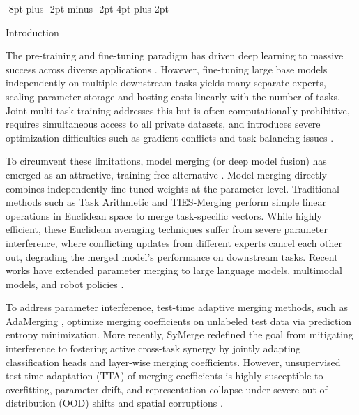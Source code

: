 \documentclass{article}
\makeatletter
\theoremstyle{plain}
\theoremstyle{definition}
\theoremstyle{remark}
\renewcommand{\section}{\@startsection{section}{1}{\z@}%
                       {-8pt plus -2pt minus -2pt}%
                       {4pt plus 2pt}%
                       {\normalfont\large\bfseries\raggedright}}
\makeatother
\begin{document}
\section{Introduction}
\label{sec:intro}

The pre-training and fine-tuning paradigm has driven deep learning to massive success across diverse applications \cite{devlin2018bert,vaswani2017attention,he2016deep,dosovitskiy2020image,aslam2024continual,baysal2025overcoming,tseng2025incremental}. However, fine-tuning large base models independently on multiple downstream tasks yields many separate experts, scaling parameter storage and hosting costs linearly with the number of tasks. Joint multi-task training addresses this but is often computationally prohibitive, requires simultaneous access to all private datasets, and introduces severe optimization difficulties such as gradient conflicts and task-balancing issues \cite{yadav2023ties,mao2025multi-task,wu2025attention-based,cao2024multi-task,huang2025optimization,boiarov2021simultaneous,he2024robust,fan2023maxgnr,choi2023task-aware}.

To circumvent these limitations, model merging (or deep model fusion) has emerged as an attractive, training-free alternative \cite{wortsman2022model,ilharco2022editing,li2023deep,tang2024fusionbench,saadati2024dimat,du2024parameter,liu2025sens-merging,qiu2026parameter,zeng2025robustmerge,zeng2025parameter}. Model merging directly combines independently fine-tuned weights at the parameter level. Traditional methods such as Task Arithmetic \cite{ilharco2022editing} and TIES-Merging \cite{yadav2023ties} perform simple linear operations in Euclidean space to merge task-specific vectors. While highly efficient, these Euclidean averaging techniques suffer from severe parameter interference, where conflicting updates from different experts cancel each other out, degrading the merged model's performance on downstream tasks. Recent works have extended parameter merging to large language models, multimodal models, and robot policies \cite{jang2023personalized,yadav2025robust,li2025multi-modality,hui2024upcycling,ju2024mitigating}.

To address parameter interference, test-time adaptive merging methods, such as AdaMerging \cite{yang2023adamerging}, optimize merging coefficients on unlabeled test data via prediction entropy minimization. More recently, SyMerge \cite{jung2025symerge} redefined the goal from mitigating interference to fostering active cross-task synergy by jointly adapting classification heads and layer-wise merging coefficients. However, unsupervised test-time adaptation (TTA) of merging coefficients is highly susceptible to overfitting, parameter drift, and representation collapse under severe out-of-distribution (OOD) shifts and spatial corruptions \cite{huang2022extrapolative,zhao2025threshold,lei2025two-level,jia2024tinytta,yeo2023rapid,bhardwaj2022benchmarking,zhang2024unsupervised,chen2022contrastive,kim2023when,zhang2025scap,gui2024active,yin2025test-time}.
\end{document}
